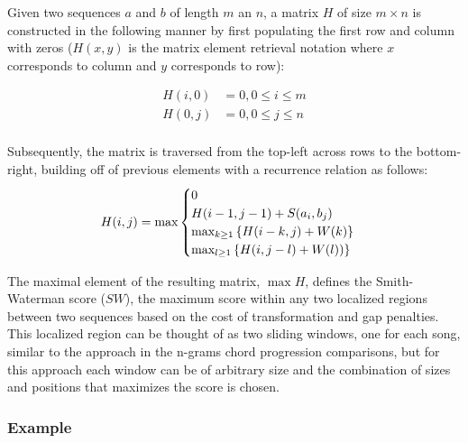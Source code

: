



Given two sequences $a$ and $b$ of length $m$ an $n$, a matrix $H$ of size $m \times n$ is constructed in the following manner by first populating the first row and column with zeros ($H(x,y)$ is the matrix element retrieval notation where $x$ corresponds to column and $y$ corresponds to row):

\begin{align*}
H(i,0) &= 0, 0 \leq i \leq m \\
H(0,j) &= 0, 0 \leq j \leq n \\
\end{align*}

Subsequently, the matrix is traversed from the top-left across rows to the bottom-right, building off of previous elements with a recurrence relation as follows:
\[ H(i,j) = \hbox{max} \begin{cases} 0 \\ H(i-1,j-1)+S(a_i,b_j) \\ \hbox{max}_{k \geq 1} \left\{ H(i-k,j)+W(k) \right\} \\ \hbox{max}_{l \geq 1}\left\{ H(i, j-l)+W(l)) \right\} \end{cases}  \]

The maximal element of the resulting matrix, $\max H$, defines the Smith-Waterman score ($SW$), the maximum score within any two localized regions between two sequences based on the cost of transformation and gap penalties. This localized region can be thought of as two sliding windows, one for each song, similar to the approach in the n-grams chord progression comparisons, but for this approach each window can be of arbitrary size and the combination of sizes and positions that maximizes the score is chosen.

\subsubsection{Example}

